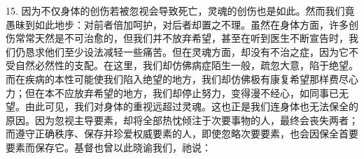 15. 因为不仅身体的创伤若被忽视会导致死亡，灵魂的创伤也是如此。然而我们竟愚昧到如此地步：对前者倍加呵护，对后者却置之不理。虽然在身体方面，许多创伤常常天然是不可治愈的，但我们并不放弃希望，甚至在听到医生不断宣告时，我们仍恳求他们至少设法减轻一些痛苦。但在灵魂方面，却没有不治之症，因为它不受自然必然性的支配。在这里，我们却仿佛病症陌生一般，疏忽大意，陷于绝望。而在疾病的本性可能使我们陷入绝望的地方，我们却仿佛极有康复希望那样费尽心力；但在本不应放弃希望的地方，我们却停止努力，变得漫不经心，如同事已无望。由此可见，我们对身体的重视远超过灵魂。这也正是我们连身体也无法保全的原因。因为忽视主导要素，却将全部热忱倾注于次要事物的人，最终会丧失两者；而遵守正确秩序、保存并珍爱权威要素的人，即使忽略次要要素，也会因保全首要要素而保存它。基督也曾以此晓谕我们，祂说：\par

